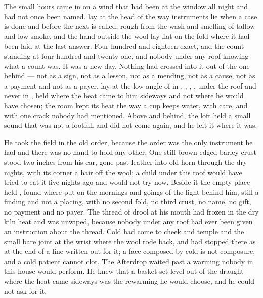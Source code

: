 
The small hours came in on a wind that had been at the window all night and had not once been named.  lay at the head of  the way instruments lie when a case is done and before the next is called, rough from the wash and smelling of tallow and low smoke, and the hand outside the wool lay flat on the fold where it had been laid at the last answer. Four hundred and eighteen exact, and the count standing at four hundred and twenty-one, and nobody under any roof knowing what a count was. It was a new day. Nothing had crossed into it out of the one behind --- not as a sign, not as a lesson, not as a mending, not as a cause, not as a payment and not as a payer.  lay at the low angle of  in , , , , under the roof and never in , held where the heat came to him sideways and not where he would have chosen; the room kept its heat the way a cup keeps water, with care, and with one crack nobody had mentioned. Above and behind, the loft held a small sound that was not a footfall and did not come again, and he left it where it was.

He took the field in the old order, because the order was the only instrument he had and there was no hand to hold any other. One stiff brown-edged barley crust stood two inches from his ear, gone past leather into old horn through the dry nights, with its corner a hair off the wool; a child under this roof would have tried to eat it five nights ago and would not try now. Beside it the empty place held , found where put on the mornings and goings of the light behind him, still a finding and not a placing, with no second fold, no third crust, no name, no gift, no payment and no payer. The thread of drool at his mouth had frozen in the dry kiln heat and was unwiped, because nobody under any roof had ever been given an instruction about the thread. Cold had come to cheek and temple and the small bare joint at the wrist where the wool rode back, and had stopped there as at the end of a line written out for it; a face composed by cold is not composure, and a cold patient cannot clot. The Afterdrop waited past a warming nobody in this house would perform. He knew that a basket set level out of the draught where the heat came sideways was the rewarming he would choose, and he could not ask for it.


